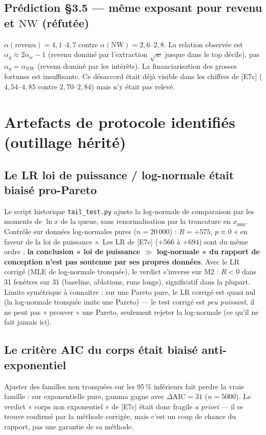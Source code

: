 \documentclass[11pt,a4paper]{article}
\newcommand{\NW}{\mathrm{NW}}
\newcommand{\code}[1]{\texttt{#1}}
\begin{document}
\subsection{Prédiction §3.5 — même exposant pour revenu et $\NW$ (réfutée)}
$\alpha(\text{revenu}) = 4{,}1$--$4{,}7$ contre $\alpha(\NW) = 2{,}6$--$2{,}8$.
La relation observée est $\alpha_y \approx 2\alpha_w - 1$ (revenu dominé par
l'extraction $\sqrt{w}$ jusque dans le top décile), pas
$\alpha_y = \alpha_{\NW}$ (revenu dominé par les intérêts). La
financiarisation des grosses fortunes est insuffisante. Ce désaccord était
déjà visible dans les chiffres de [E7c] ($4{,}54$--$4{,}85$ contre
$2{,}70$--$2{,}84$) mais n'y était pas relevé.

\section{Artefacts de protocole identifiés (outillage hérité)}

\subsection{Le LR loi de puissance / log-normale était biaisé pro-Pareto}
Le script historique \code{tail\_test.py} ajuste la log-normale de
comparaison par les moments de $\ln x$ de la queue, sans renormalisation par
la troncature en $x_{\min}$. Contrôle sur données log-normales pures
($n = 20\,000$) : $R = +575$, $p \approx 0$ « en faveur de la loi de
puissance ». Les LR de [E7c] ($+566$ à $+694$) sont du même ordre :
\textbf{la conclusion « loi de puissance $\gg$ log-normale » du rapport de
conception n'est pas soutenue par ses propres données}. Avec le LR corrigé
(MLE de log-normale tronquée), le verdict s'inverse sur M2 : $R < 0$ dans
31 fenêtres sur 31 (baseline, ablations, runs longs), significatif dans la
plupart. Limite symétrique à connaître : sur une Pareto pure, le LR corrigé
est quasi nul (la log-normale tronquée imite une Pareto) — le test corrigé
est \emph{peu puissant}, il ne peut pas « prouver » une Pareto, seulement
rejeter la log-normale (ce qu'il ne fait jamais ici).

\subsection{Le critère AIC du corps était biaisé anti-exponentiel}
Ajuster des familles non tronquées sur les 95\,\% inférieurs fait perdre la
vraie famille : sur exponentielle pure, gamma gagne avec
$\Delta\mathrm{AIC} = 31$ ($n = 5000$). Le verdict « corps non exponentiel »
de [E7c] était donc fragile \emph{a priori} — il se trouve confirmé par la
méthode corrigée, mais c'est un coup de chance du rapport, pas une garantie
de sa méthode.
\end{document}
